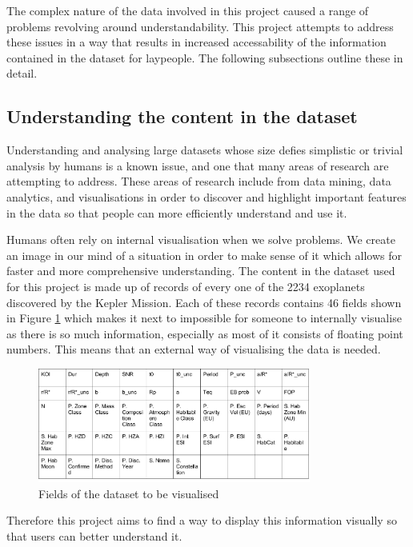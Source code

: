 The complex nature of the data involved in this project caused a range of
problems revolving around understandability. This project
attempts to address these issues in a way that results in increased
accessability of the information contained in the dataset for laypeople. The
following subsections outline these in detail.

\subsection{Understanding the content in the dataset}
Understanding and analysing large datasets whose size defies simplistic or
trivial analysis by humans is a known issue, and one that many areas of research
are
attempting to address. These areas of research include from data mining, data
analytics, and visualisations in order to discover and highlight important
features in the data so that people can more efficiently understand and use it. 

Humans often rely on internal visualisation when we solve problems. We create an
image in our mind of a situation in order to make sense of it
\cite{visualisingpiggott} which allows for faster and more comprehensive
understanding. The content in the dataset used
for this project is made up of records of every one of the 2234 exoplanets
discovered by the Kepler Mission. Each of these records contains 46 fields shown
in Figure \ref{fig:fields} which
makes it next to impossible for someone to internally visualise as there is so
much information, especially as most of it consists of floating point numbers.
This means that an external
way of visualising the data is needed.
\begin{figure}[H]
  \centering
      \includegraphics[width=0.8\textwidth]{images/data.png}
  \caption{Fields of the dataset to be visualised}
  \label{fig:fields}
\end{figure}
 Therefore this project aims to find a way to display this information visually
so that users can better understand it.
